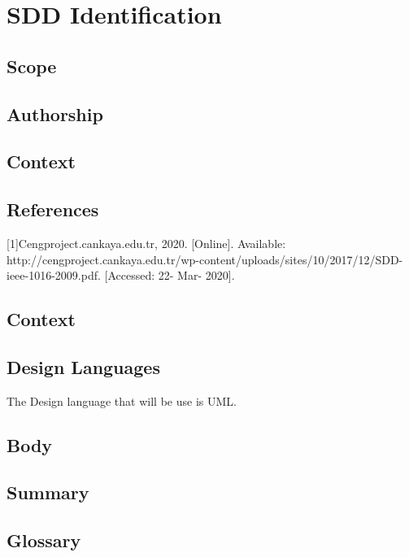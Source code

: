 \documentclass[12pt]{article}
\begin{document}
    
\section{SDD Identification}
    \subsection{Scope}
    \subsection{Authorship}
    \subsection{Context}
    \subsection{References}
[1]Cengproject.cankaya.edu.tr, 2020. [Online]. Available: http://cengproject.cankaya.edu.tr/wp-content/uploads/sites/10/2017/12/SDD-ieee-1016-2009.pdf. [Accessed: 22- Mar- 2020].
    \subsection{Context}
    \subsection{Design Languages}
    The Design language that will be use is UML.
    \subsection{Body}
    \subsection{Summary}
    \subsection{Glossary}
    
        
\end{document}
